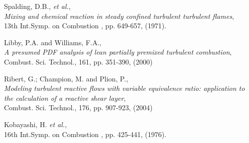 \begin{thebibliography}{4}


{\sc Spalding, D.B., {\em et al.}},\\
{\em Mixing and chemical reaction in steady confined turbulent turbulent flames},\\
13th Int.Symp. on Combustion , pp. 649-657, (1971).

{\sc Libby, P.A. and Williams, F.A.},\\
{\em A presumed PDF analysis of lean partially premixed turbulent combustion},\\
Combust. Sci. Technol., 161, pp. 351-390, (2000)

{\sc Ribert, G.; Champion, M. and Plion, P.},\\
{\em Modeling turbulent reactive flows with variable equivalence ratio: application to the calculation of a reactive shear layer},\\
Combust. Sci. Technol., 176, pp. 907-923, (2004)

{\sc Kobayashi, H. {\em et al.}},\\
16th Int.Symp. on Combustion , pp. 425-441, (1976).

\end{thebibliography}
\newpage


